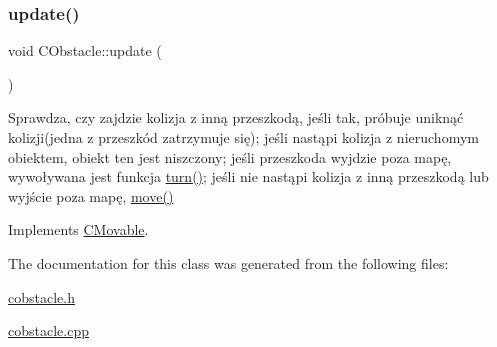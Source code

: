 \mbox{\label{class_c_obstacle_a9aeb124d28bdef3430954f5e2b5ae0f0}} 
\subsubsection{\texorpdfstring{update()}{update()}}
{\footnotesize\ttfamily void C\+Obstacle\+::update (\begin{DoxyParamCaption}{ }\end{DoxyParamCaption})\hspace{0.3cm}{\ttfamily [virtual]}}



Sprawdza, czy zajdzie kolizja z inną przeszkodą, jeśli tak, próbuje uniknąć kolizji(jedna z przeszkód zatrzymuje się); jeśli nastąpi kolizja z nieruchomym obiektem, obiekt ten jest niszczony; jeśli przeszkoda wyjdzie poza mapę, wywoływana jest funkcja \mbox{\hyperlink{class_c_obstacle_ae3aded0a2ac060a2124250a42ddacee4}{turn()}}; jeśli nie nastąpi kolizja z inną przeszkodą lub wyjście poza mapę, \mbox{\hyperlink{class_c_obstacle_a4b2e4989c993dd7f79cd66fd485c3c88}{move()}} 



Implements \mbox{\hyperlink{class_c_movable_af45fc62960d86ef62949d078141e9d62}{C\+Movable}}.



The documentation for this class was generated from the following files\+:\begin{DoxyCompactItemize}
\item 
\mbox{\hyperlink{cobstacle_8h}{cobstacle.\+h}}\item 
\mbox{\hyperlink{cobstacle_8cpp}{cobstacle.\+cpp}}\end{DoxyCompactItemize}
